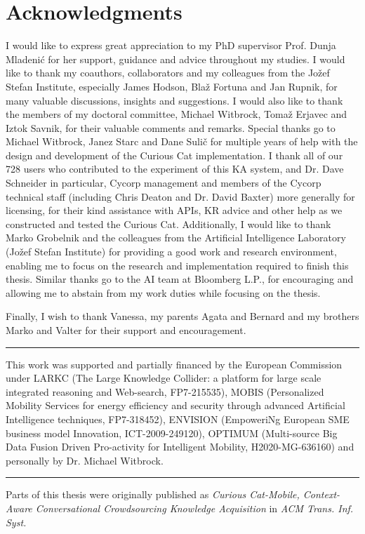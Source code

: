 % 
\chapter*{Acknowledgments}
I would like to express great appreciation to my PhD supervisor Prof. Dunja 
Mladenić for her support, guidance and advice throughout my studies. 
I would like to thank my coauthors, collaborators and
my colleagues from the Jožef Stefan Institute, especially James Hodson, Blaž Fortuna and Jan Rupnik, for many valuable discussions, 
insights and suggestions. 
I would also like to thank the members of my doctoral committee, 
Michael Witbrock, Tomaž Erjavec and Iztok Savnik, for their valuable comments and
remarks. 
Special thanks go to Michael Witbrock, Janez Starc and Dane Sulič for
multiple years of help with the design and development of the Curious Cat 
implementation. I thank all of our 728 users who contributed 
to the experiment of this KA system, and Dr. Dave Schneider in particular, 
Cycorp management and members of the Cycorp technical staff (including Chris 
Deaton and Dr. David Baxter) more generally for licensing, for their kind 
assistance with APIs, KR advice and other help as we constructed and 
tested the Curious Cat.
Additionally, I would like to thank Marko Grobelnik and the colleagues from
the Artificial Intelligence Laboratory (Jožef Stefan Institute) for providing a 
good work and research environment, enabling me to focus on the research and
implementation required to finish this thesis. Similar thanks go to the AI team
at Bloomberg L.P., for encouraging and allowing me to abstain from my work
duties while focusing on the thesis.

Finally, I wish to thank Vanessa, my parents Agata and Bernard and my brothers
Marko and Valter for their support and encouragement.

\rule{0.5\textwidth}{.4pt}

This work was supported and partially financed by the European Commission under
LARKC (The Large Knowledge Collider: a platform for large scale integrated
reasoning and Web-search, FP7-215535), MOBIS (Personalized Mobility Services 
for energy efficiency and security through advanced Artificial Intelligence 
techniques, FP7-318452), ENVISION (EmpoweriNg European SME business model 
Innovation, ICT-2009-249120), OPTIMUM (Multi-source Big Data Fusion Driven 
Pro-activity for Intelligent Mobility, H2020-MG-636160) and personally by 
Dr. Michael Witbrock.

\rule{0.5\textwidth}{.4pt}

Parts of this thesis were originally published as \emph{Curious Cat-Mobile, 
	Context-Aware Conversational Crowdsourcing Knowledge Acquisition} in 
\emph{ACM Trans. Inf. Syst.}